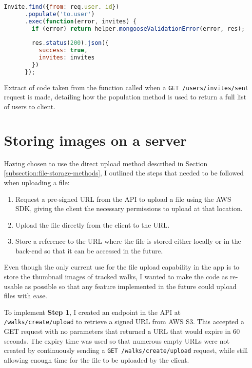 \begin{listing}
  \centering
  \begin{lstlisting}[language=javascript]
Invite.find({from: req.user._id})
      .populate('to.user')
      .exec(function(error, invites) {
        if (error) return helper.mongooseValidationError(error, res);
          
        res.status(200).json({
          success: true,
          invites: invites
        })
      });
  \end{lstlisting}
  \caption{Extract of code taken from the function called when a \texttt{GET /users/invites/sent} request is made, detailing how the population method is used to return a full list of users to client.}
  \label{listing:invite-populate}
\end{listing}

\section{Storing images on a server} \label{implementation:storing-images}

Having chosen to use the direct upload method described in Section \ref{subsection:file-storage-methods}, I outlined the steps that needed to be followed when uploading a file:

\begin{enumerate}[label=\textbf{Step \arabic*}]
  \item Request a pre-signed URL from the API to upload a file using the AWS SDK, giving the client the necessary permissions to upload at that location.
  \item Upload the file directly from the client to the URL.
  \item Store a reference to the URL where the file is stored either locally or in the back-end so that it can be accessed in the future.
\end{enumerate}

Even though the only current use for the file upload capability in the app is to store the thumbnail images of tracked walks, I wanted to make the code as re-usable as possible so that any feature implemented in the future could upload files with ease.

To implement \textbf{Step 1}, I created an endpoint in the API at \texttt{/walks/create/upload} to retrieve a signed URL from AWS S3. This accepted a GET request with no parameters that returned a URL that would expire in 60 seconds. The expiry time was used so that numerous empty URLs were not created by continuously sending a \texttt{GET /walks/create/upload} request, while still allowing enough time for the file to be uploaded by the client.

